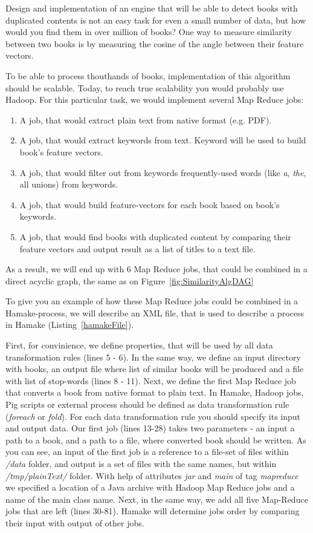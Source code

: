 \documentclass{article}
\begin{document}
Design and implementation of an engine that will be able to detect books with duplicated contents is not an 
easy task for even a small number of data, but how would you find them in over million of books?
One way to measure similarity between two books is by measuring the cosine of the angle between their feature vectors\cite{wiki:cosinesimilarity}.

To be able to process thouthands of books, implementation of this algorithm should be scalable.
Today, to reach true scalability you would probably use Hadoop. For this particular task,
 we would implement several Map Reduce jobs:

\begin{enumerate}
  \item A job, that would extract plain text from native format (e.g. PDF).
  \item A job, that would extract keywords from text. Keyword will be used to build book's feature vectors.
  \item A job, that would filter out from keywords frequently-used words (like \textit{a}, \textit{the}, all unions) from keywords.
  \item A job, that would build feature-vectors for each book based on book's keywords.
  \item A job, that would find books with duplicated content by comparing their feature vectors and output result as a list of titles to a text file.
\end{enumerate}

As a result, we will end up with 6 Map Reduce jobs, that could be combined in a direct acyclic graph, the same as on Figure~\ref{fig:SimilarityAlgDAG}

To give you an example of how these Map Reduce jobs could be combined in a Hamake-process, we will describe an XML file, that is used to describe a process in Hamake (Listing~\ref{hamakeFile}).

First, for convinience, we define properties, that will be used by all data transformation rules (lines 5 - 6). In the same way, we define
an input directory with books, an output file where list of similar books will be produced and a file with list of stop-words (lines 8 - 11).
Next, we define the first Map Reduce job that converts a book from native format to plain text. In Hamake, Hadoop jobs, Pig scripts or external process should be
defined as data transformation rule (\textit{foreach} or \textit{fold}). For each data transformation rule you should 
specify its input and output data. Our first job (lines 13-28) takes two parameters - an input a path to a book, and a path to a file, where converted book should be written. 
As you can see, an input of the first job is a reference to a file-set of files within \textit{/data} folder, and output is a
set of files with the same names, but within \textit{/tmp/plainText/} folder. With help of attributes \textit{jar} and \textit{main} of tag 
\textit{mapreduce} we specified a location of a Java archive with Hadoop Map Reduce jobs and a name of the main class name. Next, in the same way, we add all five
 Map-Reduce jobs that are left (lines 30-81). Hamake will determine jobs order by comparing their input with output of other jobs.
\end{document}
